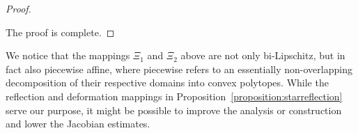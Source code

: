 \documentclass[10pt,a4paper]{article}
\begin{document}
\begin{proof}
\begin{itemize}

    \end{itemize}
    The proof is complete. 
\end{proof}







\begin{remark}
    We notice that the mappings $\Xi_{1}$ and $\Xi_{2}$ above are not only bi-Lipschitz, but in fact also piecewise affine, 
    where piecewise refers to an essentially non-overlapping decomposition of their respective domains into convex polytopes.
    While the reflection and deformation mappings in Proposition~\ref{proposition:starreflection} serve our purpose,
    it might be possible to improve the analysis or construction and lower the Jacobian estimates. 
\end{remark}
\end{document}

